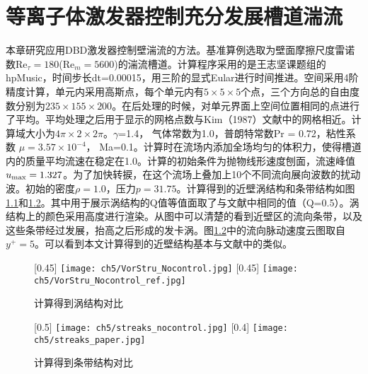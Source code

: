 \chapter{等离子体激发器控制充分发展槽道湍流}
本章研究应用DBD激发器控制壁湍流的方法。基准算例选取为壁面摩擦尺度雷诺数Re$_\tau=180$(Re$_m=5600$)的湍流槽道。计算程序采用的是王志坚课题组的hpMusic\cite{WangZJ2009,Zhu2016,Zh2017}，时间步长dt=0.00015，用三阶的显式Eular进行时间推进。空间采用4阶精度计算，单元内采用高斯点，每个单元内有$5\times5\times5$个点，三个方向总的自由度数分别为$235\times155\times200$。在后处理的时候，对单元界面上空间位置相同的点进行了平均。平均处理之后用于显示的网格点数与Kim（1987）\cite{Kim1987}文献中的网格相近。计算域大小为$4\pi \times 2\times 2\pi$。$\gamma$=1.4， 气体常数为1.0，普朗特常数Pr = 0.72，粘性系数 $\mu=3.57\times10^{-4}$， Ma=0.1。计算时在流场内添加全场均匀的体积力，使得槽道内的质量平均流速在稳定在1.0。计算的初始条件为抛物线形速度刨面，流速峰值$u_{\rm max} = 1.327$。为了加快转捩，在这个流场上叠加上10个不同流向展向波数的扰动波。初始的密度$\rho=1.0$，压力$p= 31.75$。计算得到的近壁涡结构和条带结构如图\ref{f:nearwallvortex}和\ref{f:nearwallstreak}。其中用于展示涡结构的Q值等值面取了与文献中相同的值（Q=0.5）。涡结构上的颜色采用高度进行渲染。从图中可以清楚的看到近壁区的流向条带，以及这些条带经过发展，抬高之后形成的发卡涡。图\ref{f:nearwallstreak}中的流向脉动速度云图取自$y^+=5$。可以看到本文计算得到的近壁结构基本与文献中的类似。
\begin{figure}[htb]
  \centering
  [0.45\textwidth] %
    {\texttt{[image: ch5/VorStru\_Nocontrol.jpg]}}%
  [0.45\textwidth]
    {\texttt{[image: ch5/VorStru\_Nocontrol\_ref.jpg]}}%
  \caption{计算得到涡结构对比}\label{f:nearwallvortex}
\end{figure}
\begin{figure}[htb]
  \centering
  [0.5\textwidth] %
    {\texttt{[image: ch5/streaks\_nocontrol.jpg]}}%
  [0.4\textwidth]
    {\texttt{[image: ch5/streaks\_paper.jpg]}}%
  \caption{计算得到条带结构对比}\label{f:nearwallstreak}
\end{figure}

